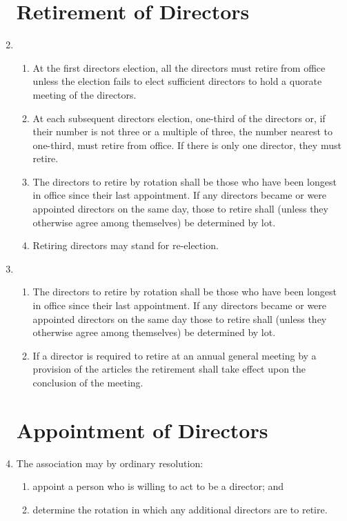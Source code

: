 \begin{enumerate}
\section{Retirement of Directors}
\item
    \begin{enumerate}
        \item At the first directors election, all the directors must retire from office unless the election
              fails to elect sufficient directors to hold a quorate meeting of the directors.
        \item At each subsequent directors election, one-third of the directors or, if their number is
              not three or a multiple of three, the number nearest to one-third, must retire from office.
              If there is only one director, they must retire.
        \item The directors to retire by rotation shall be those who have been longest in office since their
              last appointment. If any directors became or were appointed directors
              on the same day, those to retire shall (unless they otherwise agree among themselves)
              be determined by lot.
        \item Retiring directors may stand for re-election.
    \end{enumerate}

\item
  \begin{enumerate}
  \item
    The directors to retire by rotation shall be those who have been
    longest in office since their last appointment. If any directors
    became or were appointed directors on the same day those to retire
    shall (unless they otherwise agree among themselves) be determined
    by lot.
  \item
    If a director is required to retire at an annual general meeting by
    a provision of the articles the retirement shall take effect upon
    the conclusion of the meeting.
  \end{enumerate}

\section{Appointment of Directors}

\item
  The association may by ordinary resolution:
  \begin{enumerate}
  \item
    appoint a person who is willing to act to be a director; and
  \item
    determine the rotation in which any additional directors are to
    retire.
  \end{enumerate}


\end{enumerate}
